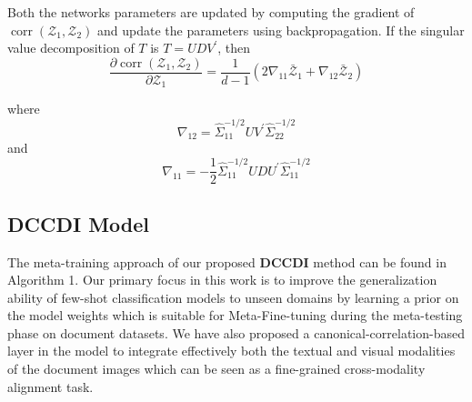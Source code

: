 
Both the networks parameters are updated by computing the gradient  of $\operatorname{corr}(\mathcal{Z}_{1},\mathcal{Z}_{2})$ and update the parameters using  backpropagation. If the singular value decomposition of $T$ is $T=U D V^{\prime}$, then
\begin{equation}\label{tab:canonical_gradient}
\frac{\partial \operatorname{corr}(\mathcal{Z}_{1}, \mathcal{Z}_{2})}{\partial \mathcal{Z}_{1}}=\frac{1}{d-1}(2 \nabla_{11} \bar{\mathcal{Z}}_{1}+\nabla_{12} \bar{\mathcal{Z}}_{2})
\end{equation}

where
$$
\nabla_{12}=\hat{\Sigma}_{11}^{-1 / 2} U V^{\prime} \hat{\Sigma}_{22}^{-1 / 2}
$$
and
$$
\nabla_{11}=-\frac{1}{2} \hat{\Sigma}_{11}^{-1 / 2} U D U^{\prime} \hat{\Sigma}_{11}^{-1 / 2}
$$


\subsection{DCCDI Model}
The meta-training approach of our proposed \textbf{DCCDI} method can be found in Algorithm 1. Our primary focus in this work is to improve the generalization ability of few-shot classification models to unseen domains by learning a prior on the model weights which is suitable for Meta-Fine-tuning during the meta-testing phase on document datasets.  We have also proposed a canonical-correlation-based layer in the model to integrate effectively both the textual and visual modalities of the document images which can be seen as a fine-grained cross-modality alignment task.

